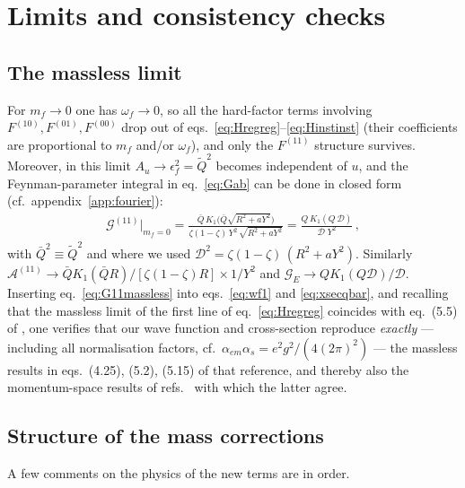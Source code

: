 \documentclass[11pt,a4paper]{article}
\newcommand{\calG}{\mathcal{G}}
\newcommand{\calA}{\mathcal{A}}
\newcommand{\calD}{\mathcal{D}}
\newcommand{\eps}{\epsilon}
\newcommand{\Qb}{\bar{Q}}
\numberwithin{equation}{section}
\begin{document}
\section{Limits and consistency checks}
\label{sec:limits}

\subsection{The massless limit}
\label{sec:massless}

For $m_f\to 0$ one has $\omega_f\to 0$, so all the hard-factor terms involving
$F^{(10)},F^{(01)},F^{(00)}$ drop out of eqs.~\eqref{eq:Hregreg}--\eqref{eq:Hinstinst} (their
coefficients are proportional to $m_f$ and/or $\omega_f$), and only the $F^{(11)}$ structure
survives. Moreover, in this limit $A_u\to\eps_f^2=\widetilde Q^2$ becomes independent of $u$,
and the Feynman-parameter integral in eq.~\eqref{eq:Gab} can be done in closed form
(cf.~appendix~\ref{app:fourier}):
\begin{align}
\label{eq:G11massless}
\calG^{(11)}\Big|_{m_f=0} = \frac{\Qb\,K_{1}\big(\Qb\sqrt{R^{2}+aY^{2}}\big)}
{\zeta(1-\zeta)\,Y^{2}\,\sqrt{R^{2}+aY^{2}}} = \frac{Q\,K_{1}(Q\,\calD)}{\calD\;Y^{2}}\,,
\end{align}
with $\Qb^2\equiv\widetilde Q^2$ and where we used
$\calD^{2}=\zeta(1-\zeta)\,(R^{2}+aY^{2})$. Similarly $\calA^{(11)}\to
\Qb K_1(\Qb R)/[\zeta(1-\zeta)R]\times 1/Y^2$ and $\calG_E\to QK_1(Q\calD)/\calD$. Inserting
eq.~\eqref{eq:G11massless} into eqs.~\eqref{eq:wf1} and \eqref{eq:xsecqbar}, and recalling
that the massless limit of the first line of eq.~\eqref{eq:Hregreg} coincides with eq.~(5.5)
of \cite{Iancu:2022gpw}, one verifies that our wave function and cross-section reproduce
\emph{exactly} --- including all normalisation factors, cf.\
$\alpha_{em}\alpha_s=e^2g^2/(4(2\pi)^2)$ --- the massless results in eqs.~(4.25), (5.2),
(5.15) of that reference, and thereby also the momentum-space results of
refs.~\cite{Ayala:2016lhd,Ayala:2017rmh} with which the latter agree.

\subsection{Structure of the mass corrections}
\label{sec:massstructure}

A few comments on the physics of the new terms are in order.
\end{document}
